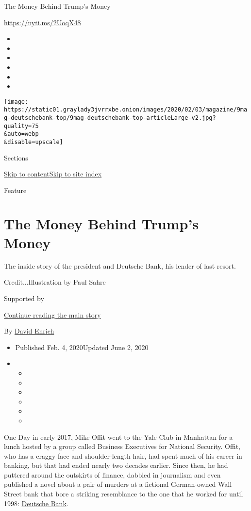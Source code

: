 The Money Behind Trump's Money

\url{https://nyti.ms/2UoqX48}

\begin{itemize}
\item
\item
\item
\item
\item
\item
\end{itemize}

\texttt{[image: https://static01.graylady3jvrrxbe.onion/images/2020/02/03/magazine/9mag-deutschebank-top/9mag-deutschebank-top-articleLarge-v2.jpg?quality=75\\\&auto=webp\\\&disable=upscale]}

Sections

\protect\hyperlink{site-content}{Skip to
content}\protect\hyperlink{site-index}{Skip to site index}

Feature

\hypertarget{the-money-behind-trumps-money}{%
\section{The Money Behind Trump's
Money}\label{the-money-behind-trumps-money}}

The inside story of the president and Deutsche Bank, his lender of last
resort.

Credit...Illustration by Paul Sahre

Supported by

\protect\hyperlink{after-sponsor}{Continue reading the main story}

By \href{https://www.nytimes3xbfgragh.onion/by/david-enrich}{David
Enrich}

\begin{itemize}
\item
  Published Feb. 4, 2020Updated June 2, 2020
\item
  \begin{itemize}
  \item
  \item
  \item
  \item
  \item
  \item
  \end{itemize}
\end{itemize}

One Day in early 2017, Mike Offit went to the Yale Club in Manhattan for
a lunch hosted by a group called Business Executives for National
Security. Offit, who has a craggy face and shoulder-­length hair, had
spent much of his career in banking, but that had ended nearly two
decades earlier. Since then, he had puttered around the outskirts of
finance, dabbled in journalism and even published a novel about a pair
of murders at a fictional German-­owned Wall Street bank that bore a
striking resemblance to the one that he worked for until 1998:
­\href{https://www.nytimes3xbfgragh.onion/2020/06/02/business/jeffrey-epstein-deutsche-bank.html}{Deutsche
Bank}.

